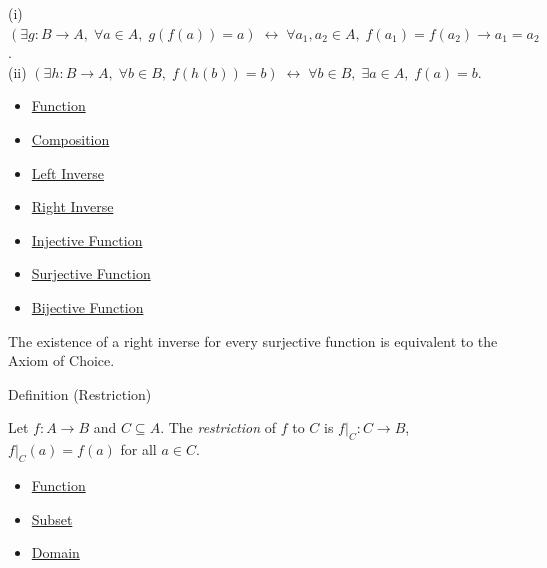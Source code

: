 \begin{remark*}
(i) $(\exists g: B\to A,\; \forall a\in A,\; g(f(a))=a) \;\leftrightarrow\; \forall a_1,a_2\in A,\; f(a_1)=f(a_2)\to a_1=a_2$.\\
(ii) $(\exists h: B\to A,\; \forall b\in B,\; f(h(b))=b) \;\leftrightarrow\; \forall b\in B,\; \exists a\in A,\; f(a)=b$.
\end{remark*}

\begin{dependencies}
\begin{itemize}
  \item \hyperref[def:function]{Function}
  \item \hyperref[def:composition]{Composition}
  \item \hyperref[def:left-inverse-function]{Left Inverse}
  \item \hyperref[def:right-inverse-function]{Right Inverse}
  \item \hyperref[def:injective]{Injective Function}
  \item \hyperref[def:surjective]{Surjective Function}
  \item \hyperref[def:bijective]{Bijective Function}
\end{itemize}
\end{dependencies}

\begin{remark*}
The existence of a right inverse for every surjective function is equivalent
to the Axiom of Choice.
\end{remark*}

\begin{definitionbox}{Definition (Restriction)}
\begin{definition}[Restriction]\label{def:restriction}
Let $f : A \to B$ and $C \subseteq A$. The \emph{restriction} of $f$ to $C$
is $f|_C : C \to B$, $f|_C(a) = f(a)$ for all $a \in C$.
\end{definition}
\end{definitionbox}

\begin{dependencies}
\begin{itemize}
  \item \hyperref[def:function]{Function}
  \item \hyperref[def:subset]{Subset}
  \item \hyperref[def:domain]{Domain}
\end{itemize}
\end{dependencies}

